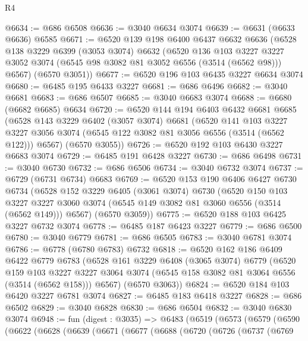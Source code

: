 \begin{lexlean}{R4}
\begin{coremodule}
@6634 := @686 @6508
@6636 := @3040 @6634 @3074
@6639 := @6631 (@6633 @6636) @6585
@6671 := @6520
    @139
    @198
    @6400
    @6437
    @6632
    @6636
    (@6528
      @138
      @3229
      @6399
      (@3053 @3074)
      @6632
      (@6520
        @136
        @103
        @3227
        @3227
        @3052
        @3074
        (@6545 @98 @3082 @81 @3052 @6556 (@3514 (@6562 @98)))
        @6567)
      (@6570 @3051))
@6677 := @6520 @196 @103 @6435 @3227 @6634 @3074
@6680 := @6485 @195 @6433 @3227
@6681 := @686 @6496
@6682 := @3040 @6681
@6683 := @686 @6507
@6685 := @3040 @6683 @3074
@6688 := @6680 (@6682 @6685) @6634
@6720 := @6520
    @144
    @194
    @6403
    @6432
    @6681
    @6685
    (@6528
      @143
      @3229
      @6402
      (@3057 @3074)
      @6681
      (@6520
        @141
        @103
        @3227
        @3227
        @3056
        @3074
        (@6545 @122 @3082 @81 @3056 @6556 (@3514 (@6562 @122)))
        @6567)
      (@6570 @3055))
@6726 := @6520 @192 @103 @6430 @3227 @6683 @3074
@6729 := @6485 @191 @6428 @3227
@6730 := @686 @6498
@6731 := @3040 @6730
@6732 := @686 @6506
@6734 := @3040 @6732 @3074
@6737 := @6729 (@6731 @6734) @6683
@6769 := @6520
    @153
    @190
    @6406
    @6427
    @6730
    @6734
    (@6528
      @152
      @3229
      @6405
      (@3061 @3074)
      @6730
      (@6520
        @150
        @103
        @3227
        @3227
        @3060
        @3074
        (@6545 @149 @3082 @81 @3060 @6556 (@3514 (@6562 @149)))
        @6567)
      (@6570 @3059))
@6775 := @6520 @188 @103 @6425 @3227 @6732 @3074
@6778 := @6485 @187 @6423 @3227
@6779 := @686 @6500
@6780 := @3040 @6779
@6781 := @686 @6505
@6783 := @3040 @6781 @3074
@6786 := @6778 (@6780 @6783) @6732
@6818 := @6520
    @162
    @186
    @6409
    @6422
    @6779
    @6783
    (@6528
      @161
      @3229
      @6408
      (@3065 @3074)
      @6779
      (@6520
        @159
        @103
        @3227
        @3227
        @3064
        @3074
        (@6545 @158 @3082 @81 @3064 @6556 (@3514 (@6562 @158)))
        @6567)
      (@6570 @3063))
@6824 := @6520 @184 @103 @6420 @3227 @6781 @3074
@6827 := @6485 @183 @6418 @3227
@6828 := @686 @6502
@6829 := @3040 @6828
@6830 := @686 @6504
@6832 := @3040 @6830 @3074
@6948 := fun (digest : @3035) =>
  @6483
    (@6519
      (@6573
        (@6579
          (@6590
            (@6622
              (@6628
                (@6639
                  (@6671
                    (@6677
                      (@6688
                        (@6720
                          (@6726
                            (@6737
                              (@6769

\end{coremodule}
\end{lexlean}

